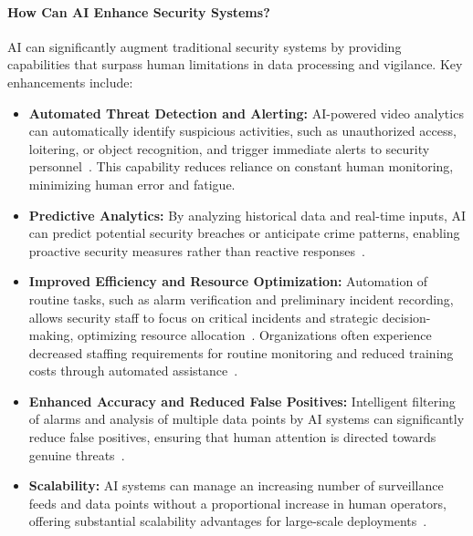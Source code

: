 \paragraph{How Can AI Enhance Security Systems?}
AI can significantly augment traditional security systems by providing capabilities that surpass human limitations in data processing and vigilance. Key enhancements include:
\begin{itemize}
    \item \textbf{Automated Threat Detection and Alerting:} AI-powered video analytics can automatically identify suspicious activities, such as unauthorized access, loitering, or object recognition, and trigger immediate alerts to security personnel~\cite{securityindustry_2025_transforming}. This capability reduces reliance on constant human monitoring, minimizing human error and fatigue.
    \item \textbf{Predictive Analytics:} By analyzing historical data and real-time inputs, AI can predict potential security breaches or anticipate crime patterns, enabling proactive security measures rather than reactive responses~\cite{securityindustry_2025_transforming}.
    \item \textbf{Improved Efficiency and Resource Optimization:} Automation of routine tasks, such as alarm verification and preliminary incident recording, allows security staff to focus on critical incidents and strategic decision-making, optimizing resource allocation~\cite{securityindustry_2025_transforming}. Organizations often experience decreased staffing requirements for routine monitoring and reduced training costs through automated assistance~\cite{securityindustry_2025_transforming}.
    \item \textbf{Enhanced Accuracy and Reduced False Positives:} Intelligent filtering of alarms and analysis of multiple data points by AI systems can significantly reduce false positives, ensuring that human attention is directed towards genuine threats~\cite{securityindustry_2025_transforming}.
    \item \textbf{Scalability:} AI systems can manage an increasing number of surveillance feeds and data points without a proportional increase in human operators, offering substantial scalability advantages for large-scale deployments~\cite{securityindustry_2025_transforming}.
\end{itemize}

